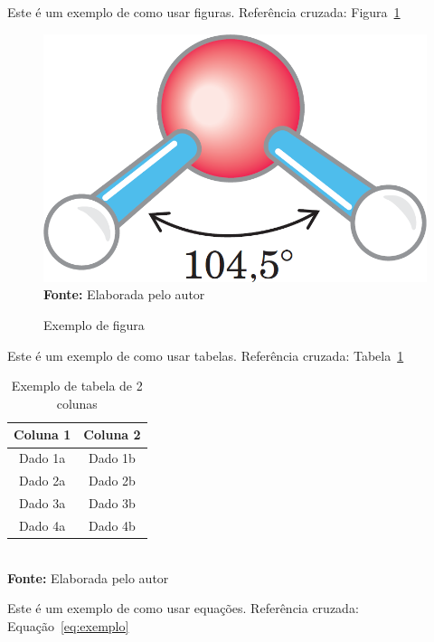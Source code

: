 Este é um exemplo de como usar figuras. Referência cruzada: Figura~\ref{fig:exemplo}

\FloatBarrier
\begin{figure}[!htbp]
	\centering
	\caption{Exemplo de figura}
	\includegraphics[scale=0.20]{imagens/exemplo}
	\\\textbf{Fonte:} Elaborada pelo autor
	\label{fig:exemplo}
\end{figure}
\FloatBarrier


Este é um exemplo de como usar tabelas. Referência cruzada: Tabela~\ref{tab:exemplo}

\FloatBarrier
\begin{table}[!htbp]
\centering
\caption{Exemplo de tabela de 2 colunas}
	\begin{tabular}{ c | c }
		\hline
		\textbf{Coluna 1} & \textbf{Coluna 2} \\ \hline
		Dado 1a           & Dado 1b           \\ \hline
		Dado 2a           & Dado 2b           \\ \hline
		Dado 3a           & Dado 3b           \\ \hline
		Dado 4a           & Dado 4b           \\ \hline
	\end{tabular}
	\\ \vspace{0.2cm}
	\textbf{Fonte:} Elaborada pelo autor
	\label{tab:exemplo}
\end{table}
\FloatBarrier


Este é um exemplo de como usar equações. Referência cruzada: Equação~\ref{eq:exemplo}

